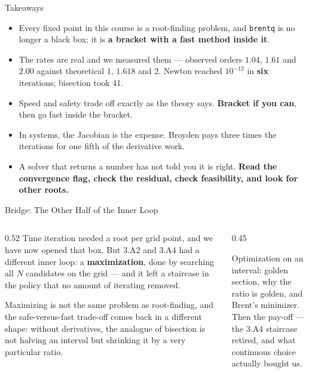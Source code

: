 \begin{frame}{Takeaways}
\begin{takeawaybox}
\begin{itemize}\small
  \item Every fixed point in this course is a root-finding problem, and \texttt{brentq} is no longer a black box: it is \textbf{a bracket with a fast method inside it}.
  \item The rates are real and we measured them --- observed orders $1.04$, $1.61$ and $2.00$ against theoretical $1$, $1.618$ and $2$. Newton reached $10^{-12}$ in \textbf{six} iterations; bisection took 41.
  \item Speed and safety trade off exactly as the theory says. \textbf{Bracket if you can}, then go fast inside the bracket.
  \item In systems, the Jacobian is the expense. Broyden pays three times the iterations for one fifth of the derivative work.
  \item A solver that returns a number has not told you it is right. \textbf{Read the convergence flag, check the residual, check feasibility, and look for other roots.}
\end{itemize}
\end{takeawaybox}
\end{frame}

\begin{frame}{Bridge: The Other Half of the Inner Loop}
\begin{columns}[T]
\begin{column}{0.52\textwidth}
\small
Time iteration needed a root per grid point, and we have now opened that box. But 3.A2 and 3.A4 had a different inner loop: a \textbf{maximization}, done by searching all $N$ candidates on the grid --- and it left a staircase in the policy that no amount of iterating removed.
\medskip

Maximizing is not the same problem as root-finding, and the safe-versus-fast trade-off comes back in a different shape: without derivatives, the analogue of bisection is not halving an interval but shrinking it by a very particular ratio.
\end{column}
\begin{column}{0.45\textwidth}
\begin{conceptbox}[title=\textbf{Next (4.A2)}]\small
Optimization on an interval: golden section, why the ratio is golden, and Brent's minimizer.\\[1mm]
Then the pay-off --- the 3.A4 staircase retired, and what continuous choice actually bought us.
\end{conceptbox}
\end{column}
\end{columns}
\end{frame}


